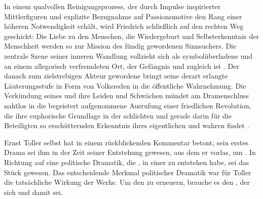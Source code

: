 In einem qualvollen Reinigungsprozess, der durch Impulse inspirierter
Mittlerfiguren und explizite Bezugnahme auf Passionsmotive den Rang einer
höheren Notwendigkeit erhält, wird Friedrich schließlich auf den rechten
Weg \Cite{zu den Menschen} geschickt: Die Liebe zu den Menschen, die
Wiedergeburt und Selbsterkenntnis der Menschheit werden so zur Mission des
fündig gewordenen Sinnsuchers. Die zentrale Szene seiner inneren Wandlung
vollzieht sich als symbolüberladene \Cite{Selbstkreuzigung} und \Cite{Geburt}
an einem allegorisch verfremdeten Ort, der Gefängnis und \Cite{Fabrik}
zugleich ist .
Der danach zum zielstrebigen Akteur gewordene \Cite{Wanderer} 
bringt seine derart erlangte Läuterungsstufe in Form von Volksreden in die
öffentliche Wahrnehmung. Die Verkündung seines 
und ihre Leiden und Schwächen mündet am Dramenschluss nahtlos in die
begeistert aufgenommene Ausrufung einer friedlichen Revolution, die ihre
euphorische Grundlage in der schlichten und gerade darin für die Beteiligten
so erschütternden Erkenntnis ihres eigentlichen und wahren \Cite{Menschseins}
findet .


Ernst Toller selbst hat in einem rückblickenden Kommentar betont, sein erstes
Drama sei ihm in der Zeit seiner Entstehung \Cite{Flugblatt} gewesen, aus dem
er vorlas, um \Cite{Dumpfe aufzurütteln, Widerstrebende zum Marschieren zu
  bringen, Tastenden den Weg zu zeigen}. In Richtung auf eine politische
Dramatik, die \Cite{aus der Unbedingtheit revolutionären Müssens}, in einer
\Cite{Synthese aus seelischem Trieb und Zwang der Vernunft} zu entstehen habe,
sei das Stück \Cite{vielleicht ein brüchiger Schritt} gewesen. Das
entscheidende Merkmal politischer Dramatik war für Toller die tatsächliche
\Cite{umpflügende und aufbauende} Wirkung der Werke. Um den \Cite{geistigen
  Inhalt menschlichen Gemeinschaftslebens} zu erneuern, brauche es den
\Cite{politischen Dichter}, der sich \Cite{verantwortlich fühlt für jeden
  Bruder menschheitlicher Gemeinschaft} und damit \Cite{stets irgendwie
  religiöser Dichter} sei.


